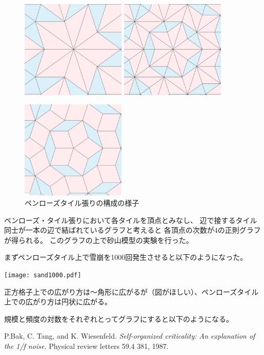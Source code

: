 \documentclass[lualatex,12pt,ja=standard]{bxjsreport}
\begin{document}
\begin{figure}[H]
\begin{center}
  \vspace{1cm}
  \includegraphics[bb=0 0 580 546,clip,width=5cm]{figures/div2inf2.png}
  \includegraphics[bb=0 0 580 546,clip,width=5cm]{figures/div3.png}

  \vspace{1cm}
  \includegraphics[bb=0 0 580 546,clip,width=5cm]{figures/unified.png}

  \caption{ペンローズタイル張りの構成の様子}
  \label{fig:penroseConstruction}
 \end{center}
\end{figure}


ペンローズ・タイル張りにおいて各タイルを頂点とみなし、
辺で接するタイル同士が一本の辺で結ばれているグラフと考えると
各頂点の次数が$4$の正則グラフが得られる。
このグラフの上で砂山模型の実験を行った。

まずペンローズタイル上で雪崩を1000回発生させると以下のようになった。
\begin{center}
\texttt{[image: sand1000.pdf]}
\end{center}
正方格子上での広がり方は〜角形に広がるが（図がほしい）、ペンローズタイル上での広がり方は円状に広がる。

規模と頻度の対数をそれぞれとってグラフにすると以下のようになる。

\begin{thebibliography}{99}
  P.Bak, C. Tang, and K. Wiesenfeld. {\em Self-organized criticality: An explanation of the 1/f noise.} 
	 Physical review letters 59.4 381, 1987.
\end{thebibliography}
\end{document}
